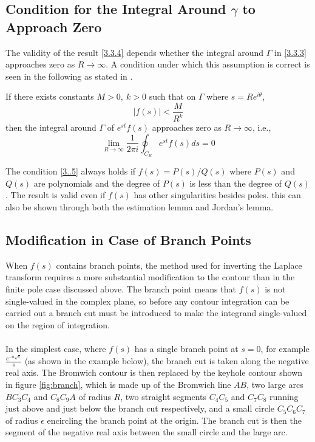 \subsection{Condition for the Integral Around $\gamma$ to Approach Zero}
The validity of the result \ref{3.3.4} depends whether the integral around $\Gamma$ in \ref{3.3.3} approaches zero as $R\rightarrow\infty$. A condition under which this assumption is correct is seen in the following as stated in \cite{TransformsTheory,WatsonLaplace}.
\begin{theorem}\label{Theorem:3.3.1}
    If there exists constants $M>0, \ k>0$ such that on $\Gamma$ where $s=Re^{i\theta}$, 
    \begin{equation}\label{3..5}
        |f(s)|<\frac{M}{R^{k}}
    \end{equation}
    then the integral around $\Gamma$ of $e^{st}f(s)$ approaches zero as $R\rightarrow\infty$, i.e., 
    \begin{equation}\label{3..6}
        \lim_{R\rightarrow\infty}\frac{1}{2\pi i}\oint_{C_R}e^{st}f(s)ds=0
    \end{equation}
\end{theorem}
The condition \ref{3..5} always holds if $f(s)=P(s)/Q(s)$ where $P(s)$ and $Q(s)$ are polynomials and the degree of $P(s)$ is less than the degree of $Q(s)$. The result is valid even if $f(s)$ has other singularities besides poles. this can also be shown through both the estimation lemma and Jordan's lemma. \cite{ComplexAnalysis, TransformsTheory,RedBook}

\newpage
\subsection{Modification in Case of Branch Points}\label{4.1.4}
When $f(s)$ contains branch points, the method used for inverting the Laplace transform requires a more substantial modification to the contour than in the finite pole case discussed above. The branch point means that $f(s)$ is not single-valued in the complex plane, so before any contour integration can be carried out a branch cut must be introduced to make the integrand single-valued on the region of integration.
\\
\\
In the simplest case, where $f(s)$ has a single branch point at $s = 0$, for example $\frac{e^{-a\sqrt{s}}}{s}$ (as shown in the example below), the branch cut is taken along the negative real axis. The Bromwich contour is then replaced by the keyhole contour shown in figure \ref{fig:branch}, which is made up of the Bromwich line $AB$, two large arcs $BC_3C_4$ and $C_8C_9A$ of radius $R$, two straight segments $C_4C_5$ and $C_7C_8$ running just above and just below the branch cut respectively, and a small circle $C_5C_6C_7$ of radius $\epsilon$ encircling the branch point at the origin. The branch cut is then the segment of the negative real axis between the small circle and the large arc.

